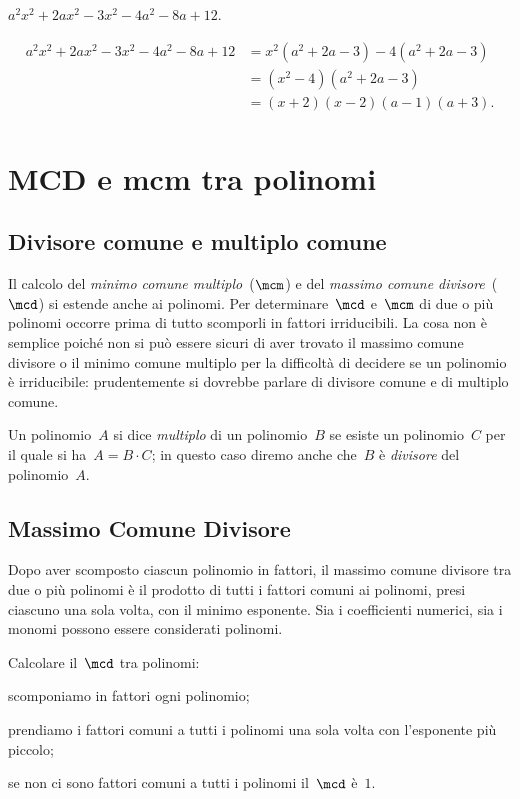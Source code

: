 \begin{exrig}
 \begin{esempio}
 $a^{2}x^{2}+2ax^{2}-3x^{2}-4a^{2}-8a+12$.

 \begin{align*}
  a^{2}x^{2}+2ax^{2}-3x^{2}-4a^{2}-8a+12&=x^{2}\left(a^{2}+2a-3\right)-4\left(a^{2}+2a-3\right)\\
  &=\left(x^{2}-4\right)\left(a^{2}+2a-3\right)\\
  &=(x+2)(x-2)(a-1)(a+3).\\
 \end{align*}
 \end{esempio}
\end{exrig}

\ovalbox{\risolvii \ref{ese:13.75}, \ref{ese:13.76}, \ref{ese:13.77}, \ref{ese:13.78}, \ref{ese:13.79}, \ref{ese:13.80}, \ref{ese:13.81}, \ref{ese:13.82}, \ref{ese:13.83}, \ref{ese:13.84}, \ref{ese:13.85}}


\section{MCD e mcm tra polinomi}

\subsection{Divisore comune e multiplo comune}

Il calcolo del \emph{minimo comune multiplo}~($\mcm$) e del \emph{massimo comune divisore}~($\mcd$) si estende anche ai polinomi.
Per determinare~$\mcd$ e~$\mcm$ di due o più polinomi occorre prima di tutto scomporli in fattori irriducibili.
La cosa non è semplice poiché non si può essere sicuri di aver trovato il massimo comune divisore o il minimo comune multiplo
per la difficoltà di decidere se un polinomio è irriducibile: prudentemente si dovrebbe parlare di divisore comune e di multiplo comune.

Un polinomio~$A$ si dice \emph{multiplo} di un polinomio~$B$ se esiste un polinomio~$C$ per il quale si ha~$A=B\cdot C$; in questo caso diremo
anche che~$B$ è \emph{divisore} del polinomio~$A$.

\subsection{Massimo Comune Divisore}
Dopo aver scomposto ciascun polinomio in fattori, il massimo comune divisore tra due o più polinomi è il prodotto di tutti i
fattori comuni ai polinomi, presi ciascuno una sola volta, con il minimo esponente.
Sia i coefficienti numerici, sia i monomi possono essere considerati polinomi.
\begin{procedura}
Calcolare il~$\mcd$ tra polinomi:
\begin{enumeratea}
\item scomponiamo in fattori ogni polinomio;
\item prendiamo i fattori comuni a tutti i polinomi una sola volta con l'esponente più piccolo;
\item se non ci sono fattori comuni a tutti i polinomi il~$\mcd$ è~$1$.
\end{enumeratea}
\end{procedura}

